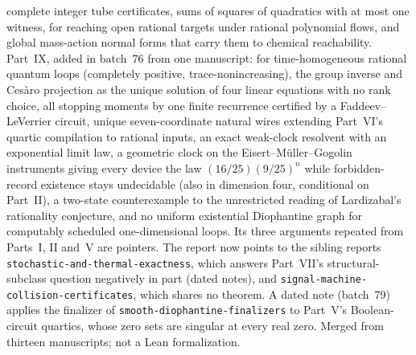 \documentclass[11pt]{article}
\newcommand{\dir}[1]{\texttt{#1}}
\begin{document}
{complete integer tube certificates, sums of squares of quadratics with at
most one witness, for reaching open rational targets under rational
polynomial flows, and global mass-action normal forms that carry them to
chemical reachability.  Part~IX, added in batch~76 from one manuscript: for
time-homogeneous rational quantum loops (completely positive,
trace-nonincreasing), the group inverse and Ces\`aro projection as the
unique solution of four linear equations with no rank choice, all stopping
moments by one finite recurrence certified by a Faddeev--LeVerrier circuit,
unique seven-coordinate natural wires extending Part~VI's quartic
compilation to rational inputs, an exact weak-clock resolvent with an
exponential limit law, a geometric clock on the Eisert--M\"uller--Gogolin
instruments giving every device the law $(16/25)(9/25)^n$ while
forbidden-record existence stays undecidable (also in dimension four,
conditional on Part~II), a two-state counterexample to the unrestricted
reading of Lardizabal's rationality conjecture, and no uniform existential
Diophantine graph for computably scheduled one-dimensional loops.  Its three
arguments repeated from Parts~I, II and~V are pointers.  The report now
points to the sibling reports \dir{stochastic-and-thermal-exactness},
which answers Part~VII's structural-subclass question negatively in part
(dated notes), and
\dir{signal-machine-collision-certificates}, which shares no theorem.
A dated note (batch~79) applies the finalizer of
\dir{smooth-diophantine-finalizers} to Part~V's Boolean-circuit quartics,
whose zero sets are singular at every real zero.
Merged from thirteen manuscripts; not a Lean formalization.}
\end{document}
